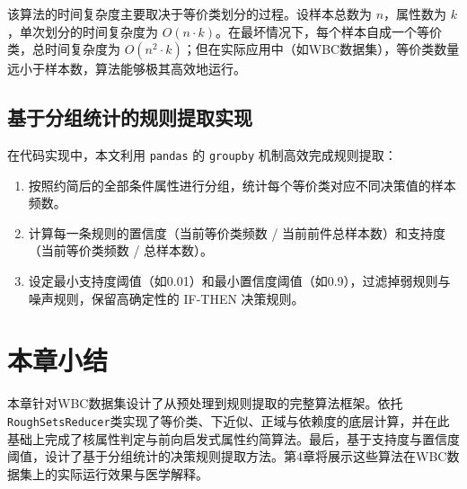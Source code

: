 
该算法的时间复杂度主要取决于等价类划分的过程。设样本总数为 \(n\)，属性数为 \(k\)，单次划分的时间复杂度为 \(O(n \cdot k)\)。在最坏情况下，每个样本自成一个等价类，总时间复杂度为 \(O(n^2 \cdot k)\)；但在实际应用中（如WBC数据集），等价类数量远小于样本数，算法能够极其高效地运行。

\subsection{基于分组统计的规则提取实现}

在代码实现中，本文利用 \texttt{pandas} 的 \texttt{groupby} 机制高效完成规则提取：
\begin{enumerate}
	\item 按照约简后的全部条件属性进行分组，统计每个等价类对应不同决策值的样本频数。
	\item 计算每一条规则的置信度（当前等价类频数 / 当前前件总样本数）和支持度（当前等价类频数 / 总样本数）。
	\item 设定最小支持度阈值（如0.01）和最小置信度阈值（如0.9），过滤掉弱规则与噪声规则，保留高确定性的 IF-THEN 决策规则。
\end{enumerate}

\section{本章小结}

本章针对WBC数据集设计了从预处理到规则提取的完整算法框架。依托\texttt{RoughSetsReducer}类实现了等价类、下近似、正域与依赖度的底层计算，并在此基础上完成了核属性判定与前向启发式属性约简算法。最后，基于支持度与置信度阈值，设计了基于分组统计的决策规则提取方法。第4章将展示这些算法在WBC数据集上的实际运行效果与医学解释。